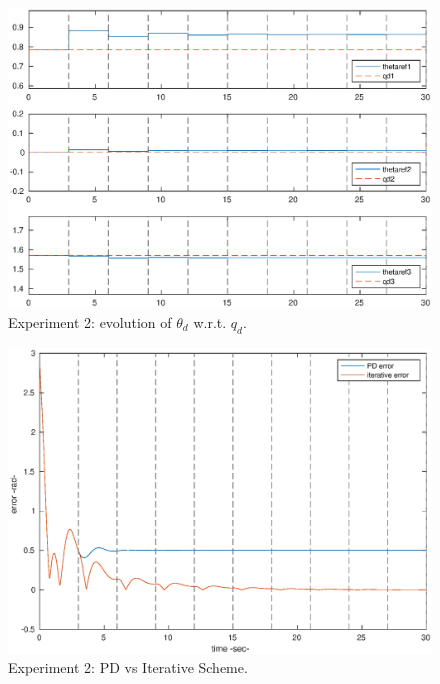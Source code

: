 \begin{figure}[h!]
\centerline{\includegraphics[scale=0.42]{figures/2_1_tqd.eps}}
\caption{\label{2_1tqd}
Experiment 2: evolution of \(\theta_d\) w.r.t. \(q_d\).}
\end{figure}

\begin{figure}[h!]
\centerline{\includegraphics[scale=0.42]{figures/2_1_pdvit.eps}}
\caption{\label{2_1pdvit}
Experiment 2: PD vs Iterative Scheme.}
\end{figure}

